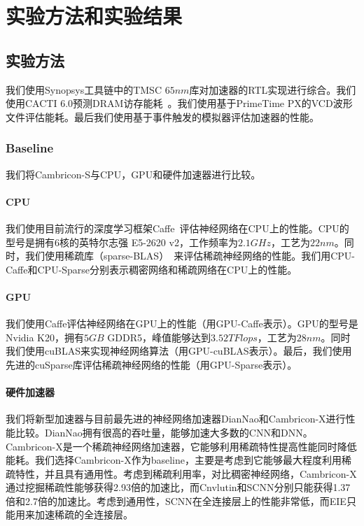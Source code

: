 \chapter{实验方法和实验结果}


\section{实验方法}
我们使用Synopsys工具链中的TMSC $65nm$库对加速器的RTL实现进行综合。我们使用CACTI 6.0预测DRAM访存能耗~\cite{muralimanohar2007optimizing}。我们使用基于PrimeTime PX的VCD波形文件评估能耗。最后我们使用基于事件触发的模拟器评估加速器的性能。

\subsection{Baseline}
我们将Cambricon-S与CPU，GPU和硬件加速器进行比较。

\subsubsection{CPU}
我们使用目前流行的深度学习框架Caffe~\cite{jia2014caffe}评估神经网络在CPU上的性能。CPU的型号是拥有6核的英特尔志强 E5-2620 v2，工作频率为$2.1GHz$，工艺为$22nm$。同时，我们使用稀疏库（sparse-BLAS）~\cite{duff2002overview}来评估稀疏神经网络的性能。我们用CPU-Caffe和CPU-Sparse分别表示稠密网络和稀疏网络在CPU上的性能。

\subsubsection{GPU}
我们使用Caffe评估神经网络在GPU上的性能（用GPU-Caffe表示）。GPU的型号是Nvidia K20，拥有$5GB$ GDDR5，峰值能够达到$3.52TFlops$，工艺为$28nm$。同时我们使用cuBLAS来实现神经网络算法（用GPU-cuBLAS表示）。最后，我们使用先进的cuSparse库评估稀疏神经网络的性能（用GPU-Sparse表示）。

\subsubsection{硬件加速器}
我们将新型加速器与目前最先进的神经网络加速器DianNao和Cambricon-X进行性能比较。DianNao拥有很高的吞吐量，能够加速大多数的CNN和DNN。Cambricon-X是一个稀疏神经网络加速器，它能够利用稀疏特性提高性能同时降低能耗。我们选择Cambricon-X作为baseline，主要是考虑到它能够最大程度利用稀疏特性，并且具有通用性。考虑到稀疏利用率，对比稠密神经网络，Cambricon-X通过挖掘稀疏性能够获得2.93倍的加速比，而Cnvlutin和SCNN分别只能获得1.37倍和2.7倍的加速比。考虑到通用性，SCNN在全连接层上的性能非常低，而EIE只能用来加速稀疏的全连接层。

